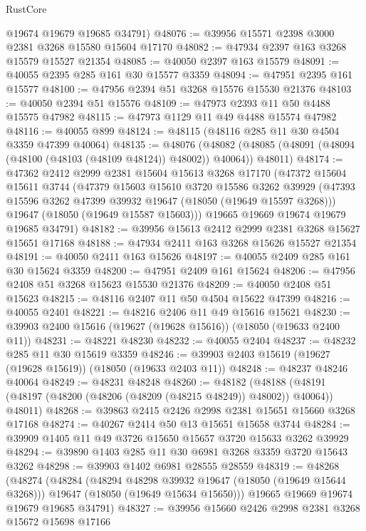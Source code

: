 \begin{lexlean}{RustCore}
\begin{coremodule}
      @19674
      @19679
      @19685
      @34791)
@48076 := @39956 @15571 @2398 @3000 @2381 @3268 @15580 @15604 @17170
@48082 := @47934 @2397 @163 @3268 @15579 @15527 @21354
@48085 := @40050 @2397 @163 @15579
@48091 := @40055 @2395 @285 @161 @30 @15577 @3359
@48094 := @47951 @2395 @161 @15577
@48100 := @47956 @2394 @51 @3268 @15576 @15530 @21376
@48103 := @40050 @2394 @51 @15576
@48109 := @47973 @2393 @11 @50 @4488 @15575 @47982
@48115 := @47973 @1129 @11 @49 @4488 @15574 @47982
@48116 := @40055 @899
@48124 := @48115 (@48116 @285 @11 @30 @4504 @3359 @47399 @40064)
@48135 := @48076
    (@48082 (@48085 (@48091 (@48094 (@48100 (@48103 (@48109 @48124)) @48002)) @40064)) @48011)
@48174 := @47362
    @2412
    @2999
    @2381
    @15604
    @15613
    @3268
    @17170
    (@47372
      @15604
      @15611
      @3744
      (@47379
        @15603
        @15610
        @3720
        @15586
        @3262
        @39929
        (@47393 @15596 @3262 @47399 @39932 @19647 (@18050 (@19649 @15597 @3268)))
        @19647
        (@18050 (@19649 @15587 @15603)))
      @19665
      @19669
      @19674
      @19679
      @19685
      @34791)
@48182 := @39956 @15613 @2412 @2999 @2381 @3268 @15627 @15651 @17168
@48188 := @47934 @2411 @163 @3268 @15626 @15527 @21354
@48191 := @40050 @2411 @163 @15626
@48197 := @40055 @2409 @285 @161 @30 @15624 @3359
@48200 := @47951 @2409 @161 @15624
@48206 := @47956 @2408 @51 @3268 @15623 @15530 @21376
@48209 := @40050 @2408 @51 @15623
@48215 := @48116 @2407 @11 @50 @4504 @15622 @47399
@48216 := @40055 @2401
@48221 := @48216 @2406 @11 @49 @15616 @15621
@48230 := @39903 @2400 @15616 (@19627 (@19628 @15616)) (@18050 (@19633 @2400 @11))
@48231 := @48221 @48230
@48232 := @40055 @2404
@48237 := @48232 @285 @11 @30 @15619 @3359
@48246 := @39903 @2403 @15619 (@19627 (@19628 @15619)) (@18050 (@19633 @2403 @11))
@48248 := @48237 @48246 @40064
@48249 := @48231 @48248
@48260 := @48182
    (@48188 (@48191 (@48197 (@48200 (@48206 (@48209 (@48215 @48249)) @48002)) @40064)) @48011)
@48268 := @39863 @2415 @2426 @2998 @2381 @15651 @15660 @3268 @17168
@48274 := @40267 @2414 @50 @13 @15651 @15658 @3744
@48284 := @39909 @1405 @11 @49 @3726 @15650 @15657 @3720 @15633 @3262 @39929
@48294 := @39890 @1403 @285 @11 @30 @6981 @3268 @3359 @3720 @15643 @3262
@48298 := @39903 @1402 @6981 @28555 @28559
@48319 := @48268
    (@48274
      (@48284
        (@48294 @48298 @39932 @19647 (@18050 (@19649 @15644 @3268)))
        @19647
        (@18050 (@19649 @15634 @15650)))
      @19665
      @19669
      @19674
      @19679
      @19685
      @34791)
@48327 := @39956 @15660 @2426 @2998 @2381 @3268 @15672 @15698 @17166

\end{coremodule}
\end{lexlean}
